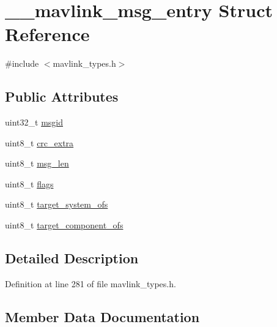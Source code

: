 \hypertarget{struct____mavlink__msg__entry}{}\section{\+\_\+\+\_\+mavlink\+\_\+msg\+\_\+entry Struct Reference}
\label{struct____mavlink__msg__entry}


{\ttfamily \#include $<$mavlink\+\_\+types.\+h$>$}

\subsection*{Public Attributes}
\begin{DoxyCompactItemize}
\item 
uint32\+\_\+t \mbox{\hyperlink{struct____mavlink__msg__entry_a9febab81ee60dbd1a91a23a5515cad31}{msgid}}
\item 
uint8\+\_\+t \mbox{\hyperlink{struct____mavlink__msg__entry_ab85eed6dcef2052cffb9093b4e2fb026}{crc\+\_\+extra}}
\item 
uint8\+\_\+t \mbox{\hyperlink{struct____mavlink__msg__entry_a694a59ebf8db1111bdc87ae20e19e57d}{msg\+\_\+len}}
\item 
uint8\+\_\+t \mbox{\hyperlink{struct____mavlink__msg__entry_a5dd6c81b1631f802139252c6032f0bf3}{flags}}
\item 
uint8\+\_\+t \mbox{\hyperlink{struct____mavlink__msg__entry_a4c94154ed0764d8084d67270b1142dfa}{target\+\_\+system\+\_\+ofs}}
\item 
uint8\+\_\+t \mbox{\hyperlink{struct____mavlink__msg__entry_a08d68ae337d99e053f02cb248a8d41b8}{target\+\_\+component\+\_\+ofs}}
\end{DoxyCompactItemize}


\subsection{Detailed Description}


Definition at line 281 of file mavlink\+\_\+types.\+h.



\subsection{Member Data Documentation}
\mbox{\label{struct____mavlink__msg__entry_ab85eed6dcef2052cffb9093b4e2fb026}} 
